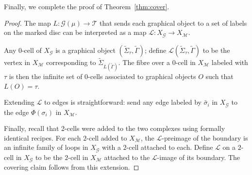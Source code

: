 \documentclass{amsart}
\theoremstyle{definition}
\def\ws{\widetilde{\Sigma}}
\begin{document}
Finally,  we complete the proof of Theorem~\ref{thm:cover}.

\begin{proof}
The map $L: \mathcal{G}(\mu)\rightarrow \mathcal{T}$ that sends each graphical object to a set of labels on the marked disc can be interpreted as a map   $\mathcal{L}:X_\mathcal{G}\rightarrow X_\mathcal{M}$.   

Any $0$-cell of $X_\mathcal{G}$ is a graphical object $(\ws_{\tau}, \widetilde{\Gamma})$; define $\mathcal{L}(\ws_{\tau}, \widetilde{\Gamma})$ to be the vertex in $X_\mathcal{M}$ corresponding to $\ws_{L(\widetilde{\Gamma})}$.  The fibre over a $0$-cell in $X_\mathcal{M}$ labeled with $\tau$ is then the infinite set of $0$-cells associated to graphical objects $O$ such that $L(O)=\tau$.  

Extending $\mathcal{L}$ to edges is straightforward: send any edge labeled by $\widetilde{\sigma_i}$ in $X_{\mathcal{G}}$ to the edge $\Phi(\sigma_i)$ in $X_{\mathcal{M}}$.

Finally, recall that 2-cells were added to the two complexes using formally  identical recipes.  For each $2$-cell added to $X_\mathcal{M}$, the $\mathcal{L}$-preimage of the boundary is an infinite family of loops in $X_\mathcal{G}$ with a $2$-cell attached to each.  Define $\mathcal{L}$ on a $2$-cell in $X_\mathcal{G}$ to be the $2$-cell in $X_\mathcal{M}$ attached to the $\mathcal{L}$-image of its boundary.  The covering claim follows from this extension.

\end{proof}
\end{document}
